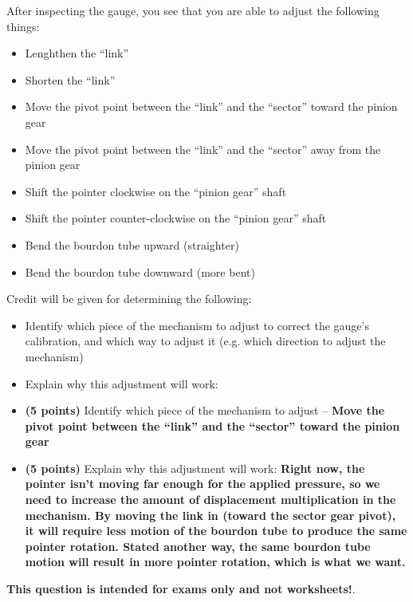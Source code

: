 \vskip 10pt

After inspecting the gauge, you see that you are able to adjust the following things:

\begin{itemize}
\item{} Lenghthen the ``link''
\item{} Shorten the ``link''
\item{} Move the pivot point between the ``link'' and the ``sector'' toward the pinion gear
\item{} Move the pivot point between the ``link'' and the ``sector'' away from the pinion gear
\item{} Shift the pointer clockwise on the ``pinion gear'' shaft
\item{} Shift the pointer counter-clockwise on the ``pinion gear'' shaft
\item{} Bend the bourdon tube upward (straighter)
\item{} Bend the bourdon tube downward (more bent)
\end{itemize}

\vskip 10pt

\noindent
Credit will be given for determining the following:

\begin{itemize}
\item{} Identify which piece of the mechanism to adjust to correct the gauge's calibration, and which way to adjust it (e.g. which direction to adjust the mechanism)
\vskip 5pt
\item{} Explain why this adjustment will work:
\end{itemize}







\begin{itemize}
\item{} {\bf (5 points)} Identify which piece of the mechanism to adjust -- {\bf Move the pivot point between the ``link'' and the ``sector'' toward the pinion gear}
\vskip 5pt
\item{} {\bf (5 points)} Explain why this adjustment will work: {\bf Right now, the pointer isn't moving far enough for the applied pressure, so we need to increase the amount of displacement multiplication in the mechanism.  By moving the link in (toward the sector gear pivot), it will require less motion of the bourdon tube to produce the same pointer rotation.  Stated another way, the same bourdon tube motion will result in more pointer rotation, which is what we want.}
\end{itemize}







{\bf This question is intended for exams only and not worksheets!}.



